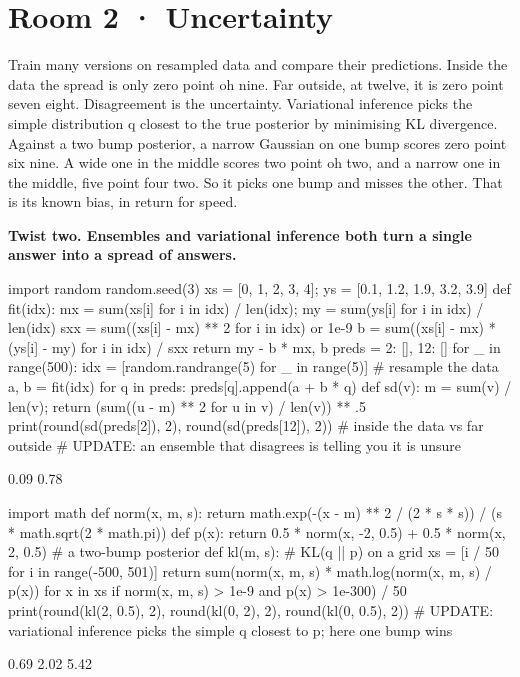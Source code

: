\documentclass[11pt,a4paper]{report}
\begin{document}
\section*{Room 2 · Uncertainty}
Train many versions on resampled data and compare their predictions. Inside the data the spread is only zero point oh nine. Far outside, at twelve, it is zero point seven eight. Disagreement is the uncertainty. Variational inference picks the simple distribution q closest to the true posterior by minimising KL divergence. Against a two bump posterior, a narrow Gaussian on one bump scores zero point six nine. A wide one in the middle scores two point oh two, and a narrow one in the middle, five point four two. So it picks one bump and misses the other. That is its known bias, in return for speed.
\begin{tcolorbox}[colback=yellow!12,colframe=orange!70!black,boxrule=0.4pt,left=4pt,right=4pt,top=2pt,bottom=2pt]\textbf{Twist two. Ensembles and variational inference both turn a single answer into a spread of answers.}\end{tcolorbox}
\begin{Code}
import random
random.seed(3)
xs = [0, 1, 2, 3, 4]; ys = [0.1, 1.2, 1.9, 3.2, 3.9]
def fit(idx):
    mx = sum(xs[i] for i in idx) / len(idx); my = sum(ys[i] for i in idx) / len(idx)
    sxx = sum((xs[i] - mx) ** 2 for i in idx) or 1e-9
    b = sum((xs[i] - mx) * (ys[i] - my) for i in idx) / sxx
    return my - b * mx, b
preds = {2: [], 12: []}
for _ in range(500):
    idx = [random.randrange(5) for _ in range(5)]    # resample the data
    a, b = fit(idx)
    for q in preds: preds[q].append(a + b * q)
def sd(v): m = sum(v) / len(v); return (sum((u - m) ** 2 for u in v) / len(v)) ** .5
print(round(sd(preds[2]), 2), round(sd(preds[12]), 2))    # inside the data vs far outside
# UPDATE: an ensemble that disagrees is telling you it is unsure
\end{Code}
\begin{Out}
0.09 0.78
\end{Out}
\begin{Code}
import math
def norm(x, m, s): return math.exp(-(x - m) ** 2 / (2 * s * s)) / (s * math.sqrt(2 * math.pi))
def p(x): return 0.5 * norm(x, -2, 0.5) + 0.5 * norm(x, 2, 0.5)    # a two-bump posterior
def kl(m, s):                               # KL(q || p) on a grid
    xs = [i / 50 for i in range(-500, 501)]
    return sum(norm(x, m, s) * math.log(norm(x, m, s) / p(x)) for x in xs
               if norm(x, m, s) > 1e-9 and p(x) > 1e-300) / 50
print(round(kl(2, 0.5), 2), round(kl(0, 2), 2), round(kl(0, 0.5), 2))
# UPDATE: variational inference picks the simple q closest to p; here one bump wins
\end{Code}
\begin{Out}
0.69 2.02 5.42
\end{Out}
\end{document}
